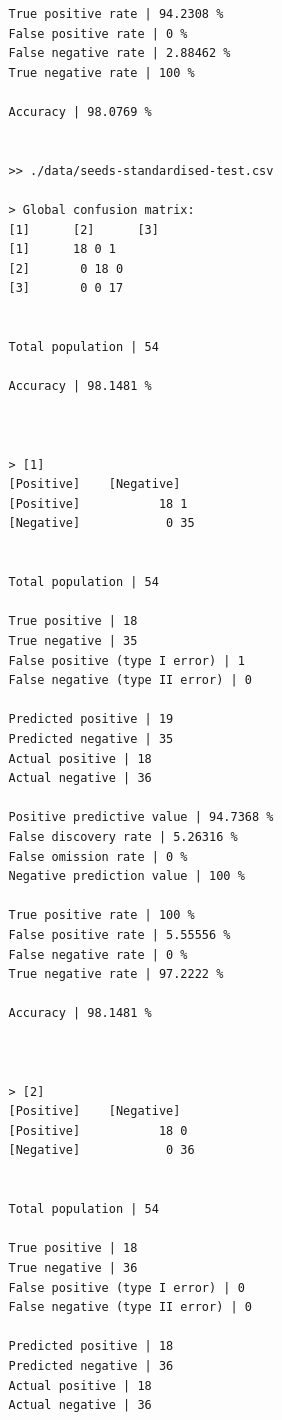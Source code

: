 \documentclass{classrep}
\begin{document}
{{{\begin{lstlisting}
                True positive rate | 94.2308 %
                False positive rate | 0 %
                False negative rate | 2.88462 %
                True negative rate | 100 %

                Accuracy | 98.0769 %


                >> ./data/seeds-standardised-test.csv

                > Global confusion matrix:
                [1]      [2]      [3]
                [1]      18 0 1
                [2]       0 18 0
                [3]       0 0 17


                Total population | 54

                Accuracy | 98.1481 %



                > [1]
                [Positive]    [Negative]
                [Positive]           18 1
                [Negative]            0 35


                Total population | 54

                True positive | 18
                True negative | 35
                False positive (type I error) | 1
                False negative (type II error) | 0

                Predicted positive | 19
                Predicted negative | 35
                Actual positive | 18
                Actual negative | 36

                Positive predictive value | 94.7368 %
                False discovery rate | 5.26316 %
                False omission rate | 0 %
                Negative prediction value | 100 %

                True positive rate | 100 %
                False positive rate | 5.55556 %
                False negative rate | 0 %
                True negative rate | 97.2222 %

                Accuracy | 98.1481 %



                > [2]
                [Positive]    [Negative]
                [Positive]           18 0
                [Negative]            0 36


                Total population | 54

                True positive | 18
                True negative | 36
                False positive (type I error) | 0
                False negative (type II error) | 0

                Predicted positive | 18
                Predicted negative | 36
                Actual positive | 18
                Actual negative | 36


\end{lstlisting}}}}
\end{document}
